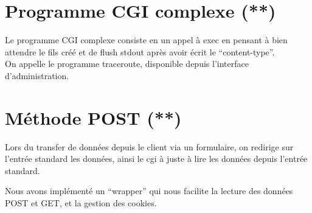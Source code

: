 \documentclass{article}
\begin{document}
\section{Programme CGI complexe (**)}

Le programme CGI complexe consiste en un appel à exec en pensant à bien attendre le fils créé et de flush stdout après avoir écrit le ``content-type''.\\

On appelle le programme traceroute, disponible depuis l'interface d'administration.

\section{Méthode POST (**)}

Lors du transfer de données depuis le client via un formulaire, on redirige sur l'entrée standard les données, ainsi le cgi à juste à lire les données depuis l'entrée standard.

Nous avons implémenté un ``wrapper'' qui nous facilite la lecture des données POST et GET, et la gestion des cookies.
\end{document}
